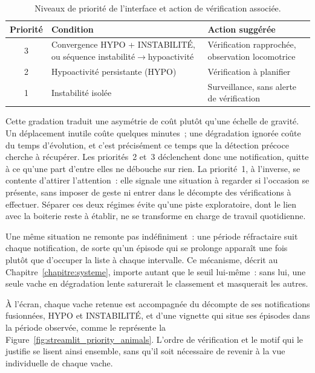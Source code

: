 \begin{table}[H]
  \centering
  \caption{Niveaux de priorité de l'interface et action de vérification associée.}
  \label{tab:priorites}
  \small
  \begin{tabular}{cp{}p{}}
    \toprule
    Priorité & Condition & Action suggérée \\
    \midrule
    3 & Convergence HYPO + INSTABILITÉ, ou séquence instabilité$\rightarrow$hypoactivité &
    Vérification rapprochée, observation locomotrice \\
    2 & Hypoactivité persistante (HYPO) & Vérification à planifier \\
    1 & Instabilité isolée & Surveillance, sans alerte de vérification \\
    \bottomrule
  \end{tabular}
\end{table}

Cette gradation traduit une asymétrie de coût plutôt qu'une échelle de gravité. Un déplacement
inutile coûte quelques minutes~; une dégradation ignorée coûte du temps d'évolution, et c'est
précisément ce temps que la détection précoce cherche à récupérer. Les priorités~2 et~3
déclenchent donc une notification, quitte à ce qu'une part d'entre elles ne débouche sur rien.
La priorité~1, à l'inverse, se contente d'attirer l'attention~: elle signale une situation à
regarder si l'occasion se présente, sans imposer de geste ni entrer dans le décompte des
vérifications à effectuer. Séparer ces deux régimes évite qu'une piste exploratoire, dont le
lien avec la boiterie reste à établir, ne se transforme en charge de travail quotidienne.

Une même situation ne remonte pas indéfiniment~: une période réfractaire suit chaque
notification, de sorte qu'un épisode qui se prolonge apparaît une fois plutôt que d'occuper la
liste à chaque intervalle. Ce mécanisme, décrit au Chapitre~\ref{chapitre:systeme}, importe
autant que le seuil lui-même~: sans lui, une seule vache en dégradation lente saturerait le
classement et masquerait les autres.

À l'écran, chaque vache retenue est accompagnée du décompte de ses notifications fusionnées,
HYPO et INSTABILITÉ, et d'une vignette qui situe ses épisodes dans la période observée, comme
le représente la Figure~\ref{fig:streamlit_priority_animals}. L'ordre de vérification et le
motif qui le justifie se lisent ainsi ensemble, sans qu'il soit nécessaire de revenir à la
vue individuelle de chaque vache.

